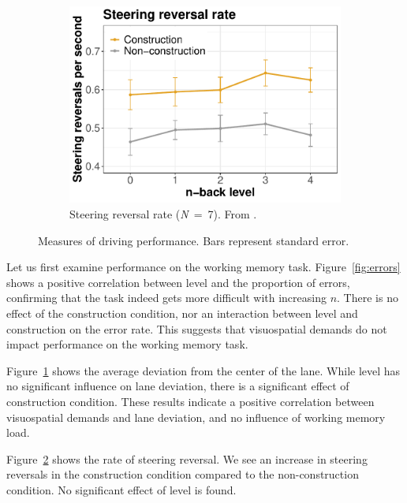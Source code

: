 \begin{figure}
\begin{subfigure}[b]{0.3\textwidth}
    \label{fig:lane-deviation}
  \end{subfigure}
  \hfill
  \begin{subfigure}[b]{0.3\textwidth}
    \centering
    \includegraphics[width=\textwidth]{images/steering_reversal.pdf}
    \caption{Steering reversal rate (\textit{N}\ =\ 7). From \citet{Kelapanda2021}.}
    \label{fig:steering-reversal}
  \end{subfigure}
     \caption{Measures of driving performance. Bars represent standard error.}
     \label{fig:performance}
\end{figure}

Let us first examine performance on the working memory task.
Figure~\ref{fig:errors} shows a positive correlation between \nback level and the proportion of errors,
confirming that the \nback task indeed gets more difficult with increasing \(n\). 
There is no effect of the construction condition, nor an interaction between \nback level and construction on the error rate.
This suggests that visuospatial demands do not impact performance on the working memory task.

Figure~\ref{fig:lane-deviation} shows the average deviation from the center of the lane.
While \nback level has no significant influence on lane deviation, there is a significant effect of construction condition.
These results indicate a positive correlation between visuospatial demands and lane deviation, and no influence of working memory load.

Figure~\ref{fig:steering-reversal} shows the rate of steering reversal.
We see an increase in steering reversals in the construction condition compared to the non-construction condition.
No significant effect of \nback level is found.

